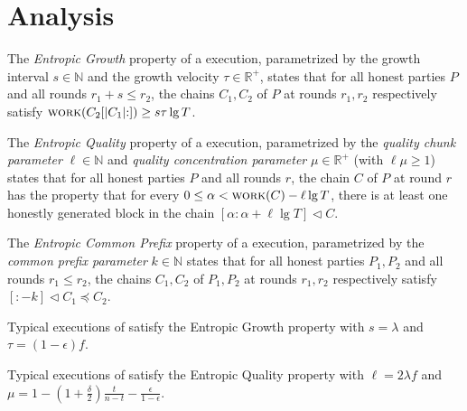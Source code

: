 \section{Analysis}

\begin{definition}
  The \emph{Entropic Growth} property of
  a \poem execution,
  parametrized by the growth interval $s \in \mathbb{N}$
  and the growth velocity $\tau \in \mathbb{R}^+$,
  states that for
  all honest parties $P$ and all rounds $r_1 + s \leq r_2$,
  the chains $C_1, C_2$ of $P$ at rounds $r_1, r_2$ respectively
  satisfy $\textsc{work}(C_2[{|C_1|}{:}]) \geq s \tau \lg T$.
\end{definition}

\begin{definition}
  The \emph{Entropic Quality} property of
  a \poem execution, parametrized by the \emph{quality chunk parameter} $\ell \in \mathbb{N}$
  and \emph{quality concentration parameter} $\mu \in \mathbb{R}^+$
  (with $\ell \mu \geq 1$)
  states that for
  all honest parties $P$ and all rounds $r$,
  the chain $C$ of $P$ at round $r$
  has the property that
  for every $0 \leq \alpha < \textsc{work}(C) - \ell \lg T$,
  there is at least one honestly generated block in the chain
  $[{\alpha}{:}{\alpha + \ell \lg T}] \lhd C$.
\end{definition}

\begin{definition}
  The \emph{Entropic Common Prefix} property of
  a \poem execution, parametrized by the \emph{common prefix parameter} $k \in \mathbb{N}$
  states that for
  all honest parties $P_1, P_2$
  and all rounds $r_1 \leq r_2$,
  the chains $C_1, C_2$ of $P_1, P_2$ at rounds $r_1, r_2$ respectively
  satisfy $[{:}{-k}] \lhd C_1 \preceq C_2$.
\end{definition}

\begin{conjecture}
  Typical executions of \poem satisfy the Entropic Growth property
  with $s = \lambda$ and $\tau = (1 - \epsilon)f$.
\end{conjecture}

\begin{conjecture}
  Typical executions of \poem satisfy the Entropic Quality property
  with $\ell = 2 \lambda f$ and
  $\mu = 1 - (1 + \frac{\delta}{2})\frac{t}{n - t} - \frac{\epsilon}{1 - \epsilon}$.
\end{conjecture}

